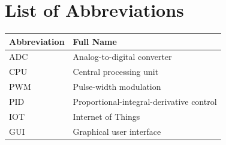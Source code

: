 
\chapter*{List of Abbreviations}

\begin{center}
\begin{tabular}{ll}
\textbf{Abbreviation} & \textbf{Full Name} \\
\hline
ADC & Analog-to-digital converter \\
CPU & Central processing unit \\
PWM & Pulse-width modulation \\
PID & Proportional-integral-derivative control \\
IOT & Internet of Things \\
GUI & Graphical user interface \\
\end{tabular}
\end{center}
